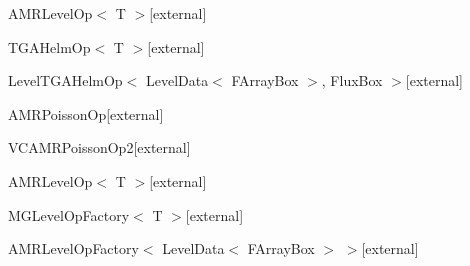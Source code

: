 \begin{DoxyCompactList}
\begin{DoxyCompactList}
\begin{DoxyCompactList}
\item A\+M\+R\+Level\+Op$<$ T $>${\ttfamily  \mbox{[}external\mbox{]}}\begin{DoxyCompactList}
\item T\+G\+A\+Helm\+Op$<$ T $>${\ttfamily  \mbox{[}external\mbox{]}}\begin{DoxyCompactList}
\item Level\+T\+G\+A\+Helm\+Op$<$ Level\+Data$<$ F\+Array\+Box $>$, Flux\+Box $>${\ttfamily  \mbox{[}external\mbox{]}}\begin{DoxyCompactList}
\item A\+M\+R\+Poisson\+Op{\ttfamily  \mbox{[}external\mbox{]}}\item {}
\item {}
\item V\+C\+A\+M\+R\+Poisson\+Op2{\ttfamily  \mbox{[}external\mbox{]}}\item {}
\item {}
\end{DoxyCompactList}
\end{DoxyCompactList}
\end{DoxyCompactList}
\item A\+M\+R\+Level\+Op$<$ T $>${\ttfamily  \mbox{[}external\mbox{]}}\end{DoxyCompactList}
\end{DoxyCompactList}
\item {}
\item M\+G\+Level\+Op\+Factory$<$ T $>${\ttfamily  \mbox{[}external\mbox{]}}\begin{DoxyCompactList}
\item A\+M\+R\+Level\+Op\+Factory$<$ Level\+Data$<$ F\+Array\+Box $>$ $>${\ttfamily  \mbox{[}external\mbox{]}}\begin{DoxyCompactList}
\item {}
\item {}
\item {}

\end{DoxyCompactList}
\end{DoxyCompactList}
\end{DoxyCompactList}

